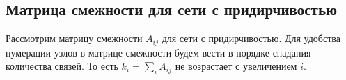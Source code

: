 \documentclass[10pt,aps,pra]{revtex4-1}
\begin{document}




\subsection{Матрица смежности для сети с придирчивостью}
Рассмотрим матрицу смежности $A_{ij}$ для сети с придирчивостью. Для удобства нумерации узлов в матрице смежности будем вести в порядке спадания количества связей. То есть $k_i=\sum\limits_{i}A_{ij}$ не возрастает с увеличением $i$.
\end{document}
